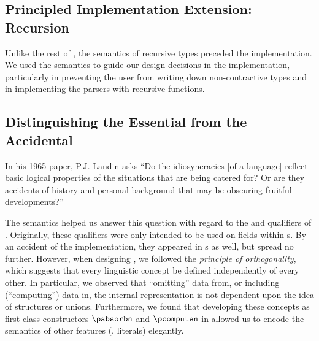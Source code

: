 \subsection{Principled Implementation Extension: Recursion}

Unlike the rest of \pads{}, the semantics of recursive types
preceded the implementation. We used the semantics to guide
our design decisions in the implementation, particularly in 
preventing the user from writing down non-contractive types and in implementing the parsers with recursive functions.

\subsection{Distinguishing the Essential from the Accidental}

In his 1965 paper, P.J. Landin asks ``Do the idiosyncracies [of a
language] reflect basic logical properties of the situations that are
being catered for?  Or are they accidents of history and personal
background that may be obscuring fruitful developments?''  

The semantics helped us answer this question with regard to the \Pomit{}
and \Pcompute{} qualifiers of \pads{}.  Originally, these qualifiers
were only intended to be used on fields within \Pstruct{}s.
By an accident of the implementation, they appeared in \Punion{}s
as well, but spread no further. However, when designing \ddc{},
we followed the {\em principle of orthogonality},
which suggests that every linguistic concept
be defined independently of every other.  In particular, we observed that
``omitting'' data from, or including (``computing'') data in,
the internal representation is not dependent upon 
the idea of structures or unions.  Furthermore, we found that
developing these concepts as first-class constructors
$\pabsorbn$ and $\pcomputen$ in \ddc{} allowed us to encode
the semantics of other \pads{} features (\eg, literals) elegantly.

